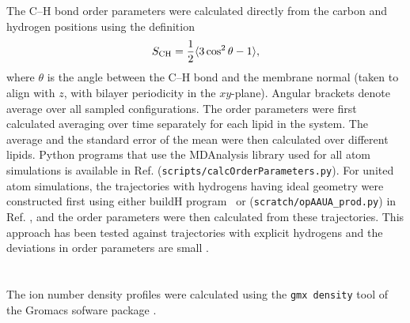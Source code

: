 \documentclass[aps,prl,superscriptaddress,twocolumn]{revtex4}
\begin{document}
The C--H bond order parameters were calculated directly
from the carbon and hydrogen positions using the definition
\begin{equation}
S_{\rm CH}=\frac{1}{2}\langle 3\cos^2\theta -1 \rangle,
\end{equation}
where $\theta$ is the angle between the C--H bond and the membrane normal
(taken to align with $z$, with bilayer periodicity in the $xy$-plane).
Angular brackets denote average over all sampled configurations.
The order parameters were first calculated averaging over time separately
for each lipid in the system. The average and
the standard error of the mean were then calculated over different lipids.
Python programs that use the MDAnalysis library \cite{agrawal11,gowers16}
used for all atom simulations is available in Ref. 
({\tt scripts/calcOrderParameters.py}). For united atom simulations, the trajectories
with hydrogens having ideal geometry were constructed first using either buildH program~\cite{buildH}
or ({\tt scratch/opAAUA\_prod.py}) in  Ref. , and the order parameters were
then calculated from these trajectories. This approach has been tested against trajectories
with explicit hydrogens and the deviations in order parameters are small \cite{buildH,piggot17}.\\
\\
\\
The ion number density profiles were calculated using the {\tt gmx density} tool
of the Gromacs sofware package \cite{gromacsMANUAL}.
\end{document}
